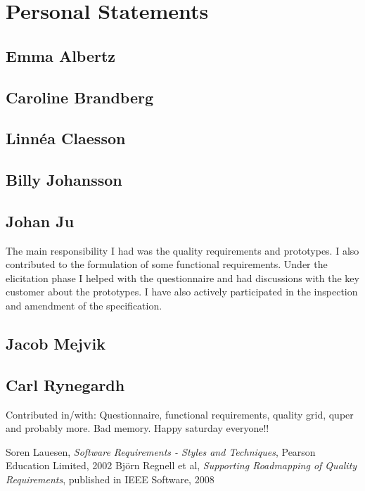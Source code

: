 \documentclass[10pt,a4paper]{article}
\begin{document}
\section{Personal Statements}

\subsection{Emma Albertz}

\subsection{Caroline Brandberg}

\subsection{Linn\'ea Claesson}

\subsection{Billy Johansson}

\subsection{Johan Ju}
The main responsibility I had was the quality requirements and prototypes. I also contributed to the formulation of some functional requirements. Under the elicitation phase I helped with the questionnaire and had discussions with the key customer about the prototypes. I have also actively participated in the inspection and amendment of the specification.

\subsection{Jacob Mejvik}

\subsection{Carl Rynegardh}
Contributed in/with: Questionnaire, functional requirements, quality grid, quper and probably more. Bad memory. Happy saturday everyone!!

\begin{thebibliography}{99}
	Soren Lauesen,
  	\emph{Software Requirements - Styles and Techniques},
  	Pearson Education Limited, 2002
	Björn Regnell et al,
	\emph{Supporting Roadmapping of Quality Requirements},
	published in IEEE Software, 2008

\end{thebibliography}
\end{document}
